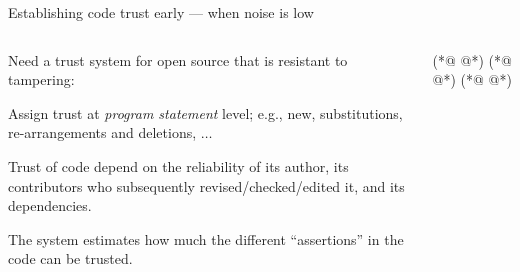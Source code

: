 \begin{frame}[fragile]{Establishing code trust early --- when noise is low}
  \setlength{\columnsep}{.1cm}
  \begin{columns}[T]
    \begin{column}{.7\textwidth}
      \begin{wideitemize}
        \item Need a trust system for open source that is resistant to tampering:
        \begin{wideitemize}
          \item Assign trust at \textit{program statement} level; {\footnotesize e.g.,
            new, substitutions, re-arrangements and deletions, $\ldots$}
          \item Trust of code depend on the reliability of {\small its author, its contributors
          who subsequently revised/checked/edited it, and its dependencies.}
        \end{wideitemize}
        \item The system estimates how much the different ``assertions'' in the code can
        be trusted. %
      \end{wideitemize}
    \end{column}
    \hfill
    \begin{column}{.7\textwidth}
      \begin{java}
        (*@  @*)
            (*@  @*)
        (*@  @*)
      \end{java}
    \end{column}
  \end{columns}
\end{frame}




